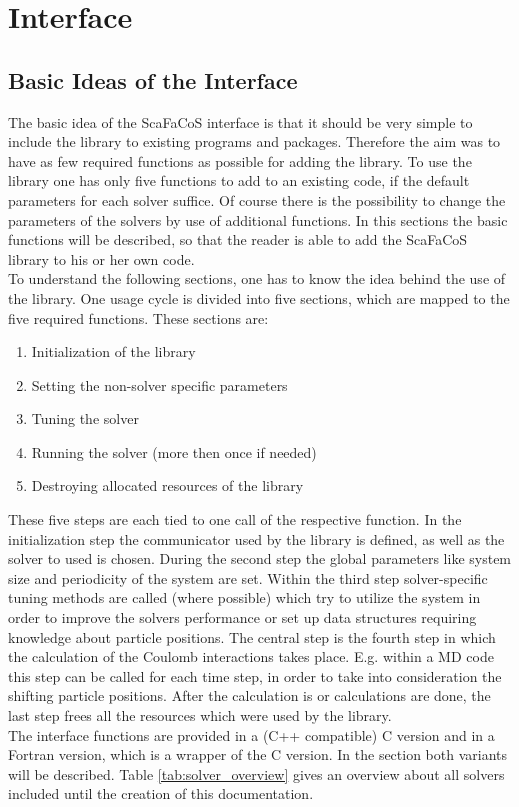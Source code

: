\chapter{Interface}
\label{cha:interface}
\raggedbottom
\renewcommand\arraystretch{1.75}




\section{Basic Ideas of the Interface}

The basic idea of the ScaFaCoS interface is that it should be very simple to include the library to existing programs and packages.
Therefore the aim was to have as few required functions as possible for adding the library. To use the library one has only five functions
to add to an existing code, if the default parameters for each solver suffice. Of course there is the possibility to change the
parameters of the solvers by use of additional functions. In this sections the basic functions will be described, so that the reader
is able to add the ScaFaCoS library to his or her own code. \\
To understand the following sections, one has to know the idea behind the use of the library. One usage cycle is divided into five
sections, which are mapped to the five required functions. These sections are:
\begin{enumerate}
  \item Initialization of the library
  \item Setting the non-solver specific parameters
  \item Tuning the solver
  \item Running the solver (more then once if needed)
  \item Destroying allocated resources of the library
\end{enumerate}
These five steps are each tied to one call of the respective function. In the initialization step the communicator used by the library is
defined, as well as the solver to used is chosen. During the second step the global parameters like system size and periodicity of the
system are set. Within the third step solver-specific tuning methods are called (where possible) which try to utilize the system
in order to improve the solvers performance or set up data structures requiring knowledge about particle positions. The central step is
the fourth step in which the calculation of the Coulomb interactions takes place. E.g. within a MD code this step can be called for
each time step, in order to take into consideration the shifting particle positions. After the calculation is or calculations are done,
the last step frees all the resources which were used by the library.\\
The interface functions are provided in a (C++ compatible) C version and in a Fortran version, which is a wrapper of the C version. In
the section both variants will be described. Table \ref{tab:solver_overview} gives an overview about all solvers included until the
creation of this documentation.

